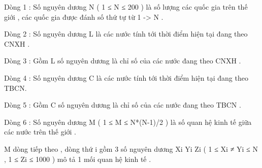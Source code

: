 Dòng 1 : Số nguyên dương N ( 1 ≤ N ≤ 200 ) là số lượng các quốc gia trên thế giới , các quốc gia được đánh số thứ tự từ 1 -> N .   


   Dòng 2 : Số nguyên dương L là các nước tính tới thời điểm hiện tại đang theo CNXH .   


   Dòng 3 : Gồm L số nguyên dương là chỉ số của các nước đang theo CNXH .   


   Dòng 4 : Số nguyên dương C là các nước tính tới thời điểm hiện tại đang theo TBCN.   


   Dòng 5 : Gồm C số nguyên dương là chỉ số của các nước đang theo TBCN .   


   Dòng 6 : Số nguyên dương M ( 1 ≤ M ≤ N*(N-1)/2 ) là số quan hệ kinh tế giữa các nước trên thế giới .   


   M dòng tiếp theo , dòng thứ i gồm 3 số nguyên dương Xi Yi Zi ( 1 ≤ Xi ≠ Yi ≤ N , 1 ≤ Zi ≤ 1000 ) mô tả 1 mối quan hệ kinh tế .